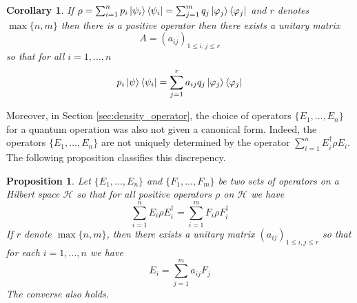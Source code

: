 \documentclass[12pt]{article}
\theoremstyle{plain}
\newtheorem{proposition}[thm]{Proposition}
\newtheorem{cor}[thm]{Corollary}
\theoremstyle{definition}
\newcommand{\call}[1]{\mathcal{#1}}
\begin{document}
	\begin{cor}\label{cor:equivalent_density_operators}
		If $\rho = \sum_{i = 1}^n p_i \ket{\psi_i}\bra{\psi_i} = \sum_{j = 1}^m q_j \ket{\varphi_j} \bra{\varphi_j}$ and $r$ denotes $\operatorname{max}\lbrace n, m \rbrace$ then there is a positive operator then there exists a unitary matrix 
		\begin{equation}
			A = (a_{ij})_{1 \leq i,j \leq r}
		\end{equation}
		so that for all $i = 1,...,n$
		\begin{equation}
			p_i \ket{\psi}\bra{\psi_i} = \sum_{j = 1}^{r}a_{ij}q_j \ket{\varphi_j}\bra{\varphi_j}
		\end{equation}
	\end{cor}
	Moreover, in Section \ref{sec:density_operator}, the choice of operators $\lbrace E_1,\ldots,E_n\rbrace$ for a quantum operation was also not given a canonical form. Indeed, the operators $\{ E_1, \ldots, E_n\}$ are not uniquely determined by the operator $\sum_{i = 1}^n E_i^\dagger \rho E_i$. The following proposition classifies this discrepency.
	\begin{proposition}\label{prop:quantum_operator_equiv}
		Let $\lbrace E_1,...,E_n\rbrace$ and $\lbrace F_1,...,F_m\rbrace$ be two sets of operators on a Hilbert space $\call{H}$ so that for all positive operators $\rho$ on $\call{H}$ we have
		\begin{equation}\label{eq:equality_qo}
			\sum_{i = 1}^n E_i \rho E_i^\dagger= \sum_{i = 1}^m F_i \rho F_i^\dagger
		\end{equation}
		If $r$ denote $\operatorname{max}\lbrace n,m \rbrace$, then there exists a unitary matrix $(a_{ij})_{1 \leq i,j \leq r}$ so that for each $i = 1,...,n$ we have
		\begin{equation}\label{eq:lin_comb_operators}
			E_i = \sum_{j = 1}^m a_{ij} F_j
		\end{equation}
		The converse also holds.
	\end{proposition}
\end{document}
